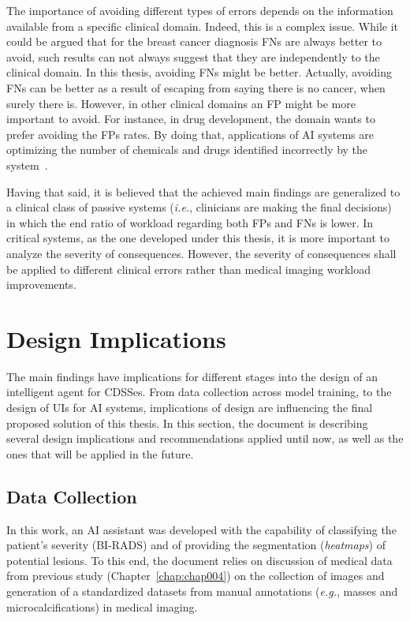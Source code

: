 \hfill

The importance of avoiding different types of errors depends on the information available from a specific clinical domain.
Indeed, this is a complex issue.
While it could be argued that for the breast cancer diagnosis \acp{FN} are always better to avoid, such results can not always suggest that they are independently to the clinical domain.
In this thesis, avoiding \acp{FN} might be better.
Actually, avoiding \acp{FN} can be better as a result of escaping from saying there is no cancer, when surely there is.
However, in other clinical domains an \ac{FP} might be more important to avoid.
For instance, in drug development, the domain wants to prefer avoiding the \acp{FP} rates.
By doing that, applications of \ac{AI} systems are optimizing the number of chemicals and drugs identified incorrectly by the system~\cite{raja2017machine}.

Having that said, it is believed that the achieved main findings are generalized to a clinical class of passive systems ({\it i.e.}, clinicians are making the final decisions) in which the end ratio of workload regarding both \acp{FP} and \acp{FN} is lower.
In critical systems, as the one developed under this thesis, it is more important to analyze the severity of consequences.
However, the severity of consequences shall be applied to different clinical errors rather than medical imaging workload improvements.

\section{Design Implications}
\label{sec:chap007004}

The main findings have implications for different stages into the design of an intelligent agent for \acp{CDSSe}.
From data collection across model training, to the design of \acp{UI} for \ac{AI} systems, implications of design are influencing the final proposed solution of this thesis.
In this section, the document is describing several design implications and recommendations applied until now, as well as the ones that will be applied in the future.

\subsection{Data Collection}
\label{sec:chap007004001}

In this work, an \ac{AI} assistant was developed with the capability of classifying the patient's severity (\ac{BI-RADS}) and of providing the segmentation ({\it heatmaps}) of potential lesions.
To this end, the document relies on discussion of medical data from previous study (Chapter~\ref{chap:chap004}) on the collection of images and generation of a standardized datasets from manual annotations ({\it e.g.}, masses and microcalcifications) in medical imaging.

